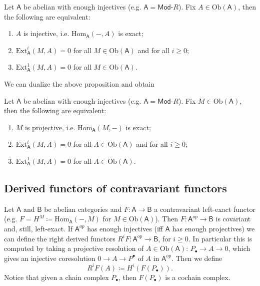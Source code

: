 \begin{prop}
	Let $\mathsf{A}$ be abelian with enough injectives
	(e.g. $\mathsf{A} = \mathsf{Mod}\text{-}R$).
	Fix $A \in \mathrm{Ob} \left(\mathsf{A}\right)$, then the following are equivalent:
	\begin{enumerate}
		\item $A$ is injective,
			i.e. $\mathrm{Hom}_{\mathsf{A}} \left( -, A \right)$ is exact;
		\item $\mathrm{Ext}^i_{\mathsf{A}}(M,A) = 0$ for all $M \in \mathrm{Ob} \left(\mathsf{A}\right)$
			and for all $i \geq 0$;
		\item $\mathrm{Ext}^1_{\mathsf{A}}(M,A) = 0$ for all $M \in \mathrm{Ob} \left(\mathsf{A}\right)$.
	\end{enumerate}
\end{prop} 
We can dualize the above proposition and obtain
\begin{prop}
	Let $\mathsf{A}$ be abelian with enough injectives
	(e.g. $\mathsf{A} = \mathsf{Mod}\text{-}R$).
	Fix $M \in \mathrm{Ob} \left(\mathsf{A}\right)$, then the following are equivalent:
	\begin{enumerate}
		\item $M$ is projective,
			i.e. $\mathrm{Hom}_{\mathsf{A}} \left( M, - \right)$ is exact;
		\item $\mathrm{Ext}^i_{\mathsf{A}}(M,A) = 0$ for all $A \in \mathrm{Ob} \left(\mathsf{A}\right)$
			and for all $i \geq 0$;
		\item $\mathrm{Ext}^1_{\mathsf{A}}(M,A) = 0$ for all $A \in \mathrm{Ob} \left(\mathsf{A}\right)$.
	\end{enumerate}
\end{prop} 

\subsection{Derived functors of contravariant functors}
\begin{rem}
	Let $\mathsf{A}$ and $\mathsf{B}$ be abelian categories and $F\colon\mathsf{A} \to \mathsf{B}$
	a contravariant left-exact functor (e.g. $F = H^M \coloneqq \mathrm{Hom}_{\mathsf{A}} \left( -, M \right)$
	for $M \in \mathrm{Ob} \left(\mathsf{A}\right)$).
	Then $F\colon\mathsf{A}^{op} \to \mathsf{B}$ is covariant and, still, left-exact.
	If $\mathsf{A}^{op}$ has enough injectives (iff $\mathsf{A}$ has enough projectives)
	we can define the right derived functors $R^iF\colon\mathsf{A}^{op} \to \mathsf{B}$, for $i \geq 0$.
	In particular this is computed by taking a projective resolution of $A \in \mathrm{Ob} \left(\mathsf{A}\right)$:
	$P_{\bullet} \to A \to 0$, which gives an injective coresolution
	$0 \to A \to P^\bullet$ of $A$ in $\mathsf{A}^{op}$.
	Then we define
	\begin{equation}
		R^iF(A) \coloneqq H^i(F(P_\bullet))
	.\end{equation} 
	Notice that given a chain complex $P_{\bullet}$, then $F(P_{\bullet})$ is a 
	cochain complex.
\end{rem}

